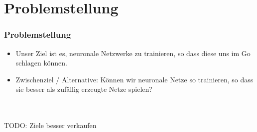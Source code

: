 \section{Problemstellung}

\begin{frame}
    \frametitle{Problemstellung}
    \begin{itemize}
        \item
            Unser Ziel ist es, neuronale Netzwerke zu trainieren, so dass diese
            uns im Go schlagen können.

        \item Zwischenziel / Alternative:
            Können wir neuronale Netze so trainieren, so dass sie besser als
            zufällig erzeugte Netze spielen?
    \end{itemize}

    \hfill \\
    \hfill \\
    TODO: Ziele besser verkaufen
\end{frame}

